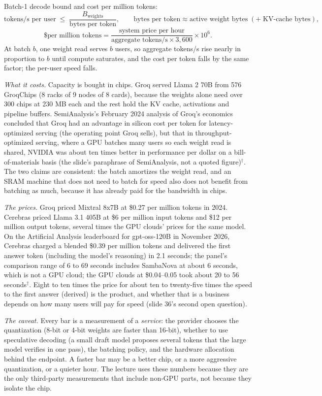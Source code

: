 \documentclass[11pt,letterpaper]{article}
\newenvironment{formulas}{\begin{tcolorbox}[formulabox]}{\end{tcolorbox}}
\begin{document}
\begin{formulas}
Batch-1 decode bound and cost per million tokens:
\[ \text{tokens/s per user} \;\le\; \frac{B_{\text{weights}}}{\text{bytes per token}}, \qquad \text{bytes per token} \approx \text{active weight bytes} \;(+\;\text{KV-cache bytes}), \]
\[ \text{\$ per million tokens} = \frac{\text{system price per hour}}{\text{aggregate tokens/s}\times 3{,}600}\times 10^{6}. \]
At batch $b$, one weight read serves $b$ users, so aggregate tokens/s rise nearly in proportion to $b$ until compute saturates, and the cost per token falls by the same factor; the per-user speed falls.
\end{formulas}

\emph{What it costs.} Capacity is bought in chips. Groq served Llama 2 70B from 576 GroqChips (8 racks of 9 nodes of 8 cards), because the weights alone need over 300 chips at 230 MB each and the rest hold the KV cache, activations and pipeline buffers. SemiAnalysis's February 2024 analysis of Groq's economics concluded that Groq had an advantage in silicon cost per token for latency-optimized serving (the operating point Groq sells), but that in throughput-optimized serving, where a GPU batches many users so each weight read is shared, NVIDIA was about ten times better in performance per dollar on a bill-of-materials basis (the slide's paraphrase of SemiAnalysis, not a quoted figure)$^\dagger$. The two claims are consistent: the batch amortizes the weight read, and an SRAM machine that does not need to batch for speed also does not benefit from batching as much, because it has already paid for the bandwidth in chips.

\emph{The prices.} Groq priced Mixtral 8x7B at \$0.27 per million tokens in 2024. Cerebras priced Llama 3.1 405B at \$6 per million input tokens and \$12 per million output tokens, several times the GPU clouds' prices for the same model. On the Artificial Analysis leaderboard for gpt-oss-120B in November 2026, Cerebras charged a blended \$0.39 per million tokens and delivered the first answer token (including the model's reasoning) in 2.1 seconds; the panel's comparison range of 6 to 69 seconds includes SambaNova at about 6 seconds, which is not a GPU cloud; the GPU clouds at \$0.04--0.05 took about 20 to 56 seconds$^\dagger$. Eight to ten times the price for about ten to twenty-five times the speed to the first answer (derived) is the product, and whether that is a business depends on how many users will pay for speed (slide 36's second open question).

\emph{The caveat.} Every bar is a measurement of a \emph{service}: the provider chooses the quantization (8-bit or 4-bit weights are faster than 16-bit), whether to use speculative decoding (a small draft model proposes several tokens that the large model verifies in one pass), the batching policy, and the hardware allocation behind the endpoint. A faster bar may be a better chip, or a more aggressive quantization, or a quieter hour. The lecture uses these numbers because they are the only third-party measurements that include non-GPU parts, not because they isolate the chip.
\end{document}
